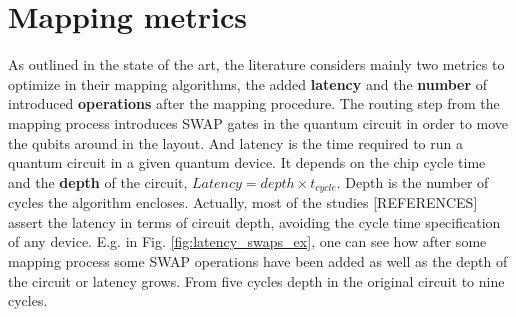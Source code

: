 \section*{Mapping metrics}
\label{sec:org503f791}
As outlined in the state of the art, the literature considers mainly two metrics to optimize in their mapping algorithms, the added \textbf{latency} and the \textbf{number} of introduced \textbf{operations} after the mapping procedure.
The routing step from the mapping process introduces SWAP gates in the quantum circuit in order to move the qubits around in the layout.
And latency is the time required to run a quantum circuit in a given quantum device.
It depends on the chip cycle time and the \textbf{depth} of the circuit, \(Latency = depth \times t_{cycle}\).
Depth is the number of cycles the algorithm encloses.
Actually, most of the studies [REFERENCES] assert the latency in terms of circuit depth, avoiding the cycle time specification of any device.
E.g. in Fig. \ref{fig:latency_swaps_ex}, one can see how after some mapping process some SWAP operations have been added as well as the depth of the circuit or latency grows.
From five cycles depth in the original circuit to nine cycles.


